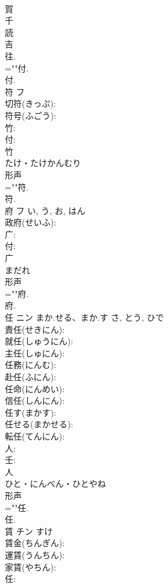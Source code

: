 \documentclass[8pt]{extreport}
\begin{document}
\begin{CJK}{UTF8}{min}
\\	賀 
\\	千 
\\	読
\\	吉 
\\	往. 
\\	=""付.
\\	付.
\\	符	フ			
\\	切符(きっぷ): 
\\	符号(ふごう): 
\\	竹: 
\\	付: 
\\	竹	
\\	たけ・たけかんむり	
\\	形声 
\\	=""符.
\\	符.
\\	府	フ		い, う, お, はん	
\\	政府(せいふ): 
\\	广: 
\\	付: 
\\	广	
\\	まだれ	
\\	形声 
\\	=""府.
\\	府.
\\	任	ニン	まか.せる、まか.す	さ, とう, ひで	
\\	責任(せきにん): 
\\	就任(しゅうにん): 
\\	主任(しゅにん): 
\\	任務(にんむ): 
\\	赴任(ふにん): 
\\	任命(にんめい): 
\\	信任(しんにん): 
\\	任す(まかす): 
\\	任せる(まかせる): 
\\	転任(てんにん): 
\\	人: 
\\	壬: 
\\	人	
\\	ひと・にんべん・ひとやね	
\\	形声 
\\	=""任.
\\	任.
\\	賃	チン		すけ	
\\	賃金(ちんぎん): 
\\	運賃(うんちん): 
\\	家賃(やちん): 
\\	任: 

\end{CJK}
\end{document}

